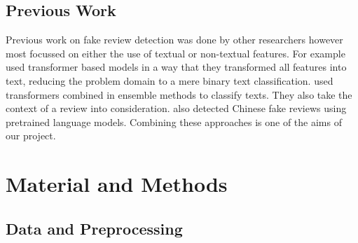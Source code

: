 \documentclass[utf8x]{ctexart}
\begin{document}
\subsection{Previous Work}

Previous work on fake review detection was done by other researchers however most focussed on either the use of textual or non-textual features. For example \cite{gu-budhkar} used transformer based models in a way that they transformed all features into text, reducing the problem domain to a mere binary text classification. \cite{mohawesh2021fake} used transformers combined in ensemble methods to classify texts. They also take the context of a review into consideration. \cite{weng2022detection} also detected Chinese fake reviews using pretrained language models. Combining these approaches is one of the aims of our project.

\section{Material and Methods}
\label{sec:format}


\subsection{Data and Preprocessing}
\end{document}

